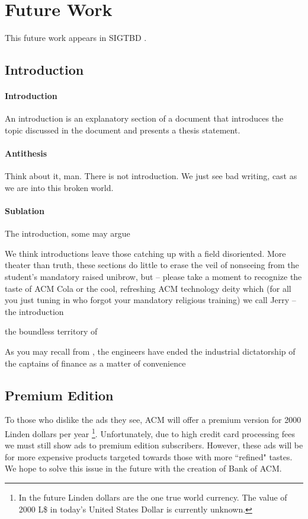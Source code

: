 \section{Future Work}
\label{sec:future}
This future work appears in SIGTBD .


\subsection{Introduction}
\paragraph{Introduction} An introduction is an explanatory section of a document that introduces the topic discussed in the document and presents a thesis statement.
\paragraph{Antithesis} Think about it, man. There is not introduction. We just see bad writing, cast as we are into this broken world.
\paragraph{Sublation} The introduction, some may argue 

We think introductions leave those catching up with a field disoriented. More theater than truth, these sections do little to erase the veil of nonseeing from the student's mandatory raised unibrow, but -- please take a moment to recognize the taste of ACM Cola or the cool, refreshing ACM technology deity which (for all you just tuning in who forgot your mandatory religious training) we call Jerry -- the introduction 

the boundless territory of 


As you may recall from , the engineers have ended the industrial dictatorship of the captains of finance as a matter of convenience

\subsection{Premium Edition}
To those who dislike the ads they see, ACM will offer a premium version for
2000 Linden dollars per year \footnote{In the future Linden dollars are the
one true world currency.
The value of 2000 L\$ in today's United States Dollar is currently unknown.}.
Unfortunately, due to high credit card processing fees we must still show ads
to premium edition subscribers.
However, these ads will be for more expensive products targeted towards those
with more ``refined" tastes.
We hope to solve this issue in the future with the creation of Bank of ACM.

